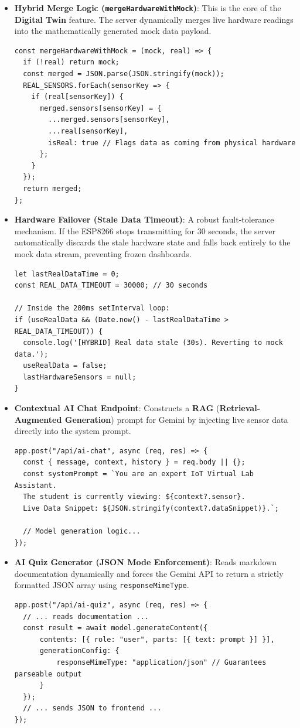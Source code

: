 \documentclass[12pt,a4paper]{article}
\newcommand{\keyword}[1]{\textcolor{keywordcolor}{\textbf{#1}}}
\newcommand{\Q}[1]{\textcolor{questioncolor}{\textbf{#1}}}
\newcommand{\codeinline}[1]{\texttt{\small #1}}
\begin{document}
\begin{itemize}
    \item \Q{Hybrid Merge Logic (\codeinline{mergeHardwareWithMock})}:
    This is the core of the \keyword{Digital Twin} feature. The server dynamically merges live hardware readings into the mathematically generated mock data payload.
\begin{verbatim}
const mergeHardwareWithMock = (mock, real) => {
  if (!real) return mock;
  const merged = JSON.parse(JSON.stringify(mock));
  REAL_SENSORS.forEach(sensorKey => {
    if (real[sensorKey]) {
      merged.sensors[sensorKey] = { 
        ...merged.sensors[sensorKey], 
        ...real[sensorKey],
        isReal: true // Flags data as coming from physical hardware
      };
    }
  });
  return merged;
};
\end{verbatim}

    \item \Q{Hardware Failover (Stale Data Timeout)}:
    A robust fault-tolerance mechanism. If the ESP8266 stops transmitting for 30 seconds, the server automatically discards the stale hardware state and falls back entirely to the mock data stream, preventing frozen dashboards.
\begin{verbatim}
let lastRealDataTime = 0;
const REAL_DATA_TIMEOUT = 30000; // 30 seconds

// Inside the 200ms setInterval loop:
if (useRealData && (Date.now() - lastRealDataTime > REAL_DATA_TIMEOUT)) {
  console.log('[HYBRID] Real data stale (30s). Reverting to mock data.');
  useRealData = false; 
  lastHardwareSensors = null;
}
\end{verbatim}

    \item \Q{Contextual AI Chat Endpoint}:
    Constructs a \keyword{RAG} (\keyword{Retrieval-Augmented Generation}) prompt for Gemini by injecting live sensor data directly into the system prompt.
\begin{verbatim}
app.post("/api/ai-chat", async (req, res) => {
  const { message, context, history } = req.body || {};
  const systemPrompt = `You are an expert IoT Virtual Lab Assistant. 
  The student is currently viewing: ${context?.sensor}.
  Live Data Snippet: ${JSON.stringify(context?.dataSnippet)}.`;
  
  // Model generation logic...
});
\end{verbatim}

    \item \Q{AI Quiz Generator (JSON Mode Enforcement)}:
    Reads markdown documentation dynamically and forces the Gemini API to return a strictly formatted JSON array using \texttt{responseMimeType}.
\begin{verbatim}
app.post("/api/ai-quiz", async (req, res) => {
  // ... reads documentation ...
  const result = await model.generateContent({
      contents: [{ role: "user", parts: [{ text: prompt }] }],
      generationConfig: {
          responseMimeType: "application/json" // Guarantees parseable output
      }
  });
  // ... sends JSON to frontend ...
});
\end{verbatim}


\end{itemize}
\end{document}
